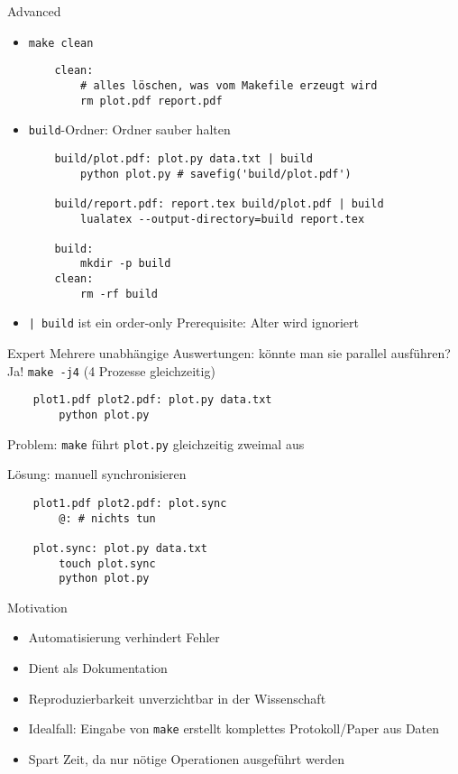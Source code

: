 \begin{frame}[fragile]{Advanced}
  \begin{itemize}
    \item \texttt{make clean}
      \begin{verbatim}
    clean:
        # alles löschen, was vom Makefile erzeugt wird
        rm plot.pdf report.pdf
      \end{verbatim}
    \item \texttt{build}-Ordner: Ordner sauber halten
      \begin{verbatim}
    build/plot.pdf: plot.py data.txt | build
        python plot.py # savefig('build/plot.pdf')

    build/report.pdf: report.tex build/plot.pdf | build
        lualatex --output-directory=build report.tex

    build:
        mkdir -p build
    clean:
        rm -rf build
      \end{verbatim}
    \item \texttt{| build} ist ein order-only Prerequisite: Alter wird ignoriert
  \end{itemize}
\end{frame}

\begin{frame}[fragile]{Expert}
  Mehrere unabhängige Auswertungen: könnte man sie parallel ausführen? \\
  Ja! \texttt{make -j4} (4 Prozesse gleichzeitig)

  \begin{verbatim}
    plot1.pdf plot2.pdf: plot.py data.txt
        python plot.py
  \end{verbatim}

  Problem: \texttt{make} führt \texttt{plot.py} gleichzeitig zweimal aus

  Lösung: manuell synchronisieren

  \begin{verbatim}
    plot1.pdf plot2.pdf: plot.sync
        @: # nichts tun

    plot.sync: plot.py data.txt
        touch plot.sync
        python plot.py
  \end{verbatim}
\end{frame}

\begin{frame}{Motivation}
  \begin{itemize}
    \item Automatisierung verhindert Fehler
    \item Dient als Dokumentation
    \item Reproduzierbarkeit unverzichtbar in der Wissenschaft
    \item Idealfall: Eingabe von \texttt{make} erstellt komplettes Protokoll/Paper aus Daten
    \item Spart Zeit, da nur nötige Operationen ausgeführt werden
  \end{itemize}
\end{frame}

